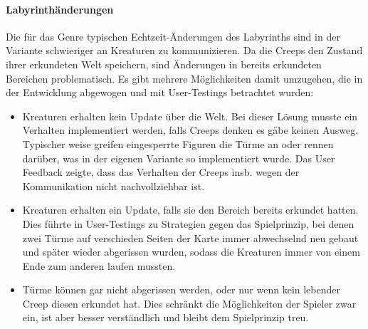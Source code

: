 \paragraph{Labyrinthänderungen} Die für das Genre typischen Echtzeit-Änderungen des Labyrinths sind in der Variante schwieriger an Kreaturen zu kommunizieren. Da die Creeps den Zustand ihrer erkundeten Welt speichern, sind Änderungen in bereits erkundeten Bereichen problematisch. Es gibt mehrere Möglichkeiten damit umzugehen, die in der Entwicklung abgewogen und mit User-Testings betrachtet wurden:
\begin{itemize}
	\item Kreaturen erhalten kein Update über die Welt. Bei dieser Lösung musste ein Verhalten implementiert werden, falls Creeps denken es gäbe keinen Ausweg. Typischer weise greifen eingesperrte Figuren die Türme an oder rennen darüber, was in der eigenen Variante so implementiert wurde. Das User Feedback zeigte, dass das Verhalten der Creeps insb. wegen der Kommunikation nicht nachvollziehbar ist.
	\item Kreaturen erhalten ein Update, falls sie den Bereich bereits erkundet hatten. Dies führte in User-Testings zu Strategien gegen das Spielprinzip, bei denen zwei Türme auf verschieden Seiten der Karte immer abwechselnd neu gebaut und später wieder abgerissen wurden, sodass die Kreaturen immer von einem Ende zum anderen laufen mussten.
	\item Türme können gar nicht abgerissen werden, oder nur wenn kein lebender Creep diesen erkundet hat. Dies schränkt die Möglichkeiten der Spieler zwar ein, ist aber besser verständlich und bleibt dem Spielprinzip treu.
\end{itemize}
